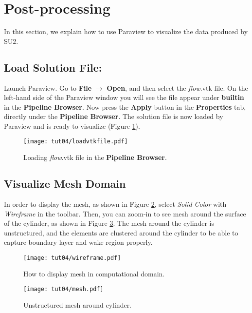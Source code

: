 \section{Post-processing}
In this section, we explain how to use Paraview to visualize the data produced by SU2.
\subsection{Load Solution File:}
Launch Paraview. Go to \textbf{File} $\rightarrow$ \textbf{Open}, and then select the \textit{flow}.vtk file. On the left-hand side of the Paraview window you will see the file appear under \textbf{builtin} in the \textbf{Pipeline Browser}. Now press the \textbf{Apply} button in the \textbf{Properties} tab, directly under the \textbf{Pipeline Browser}. The solution file is now loaded by Paraview and is ready to visualize (Figure \ref{fig4:load}).
\begin{figure}[htbp]
    \centering
    \texttt{[image: tut04/loadvtkfile.pdf]}
    \caption{Loading \textit{flow}.vtk file in the \textbf{Pipeline Browser}.}
    \label{fig4:load}
\end{figure}
\subsection{Visualize Mesh Domain}
In order to display the mesh, as shown in Figure \ref{fig4:wireframe_4}, select \textit{Solid Color} with \textit{Wireframe} in the toolbar. Then, you can zoom-in to see mesh around the surface of the cylinder, as shown in Figure \ref{fig4:mesh_4}. The mesh around the cylinder is unstructured, and the elements are clustered around the cylinder to be able to capture boundary layer and wake region properly.
\begin{figure}[htbp]
    \centering
    \texttt{[image: tut04/wireframe.pdf]}
    \caption{How to display mesh in computational domain.}
    \label{fig4:wireframe_4}
\end{figure}
\begin{figure}[htbp]
    \centering
    \texttt{[image: tut04/mesh.pdf]}
    \caption{Unstructured mesh around cylinder.}
    \label{fig4:mesh_4}
\end{figure}
